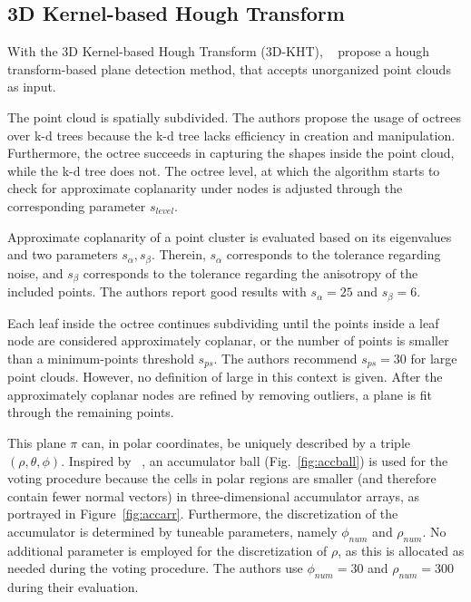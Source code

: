 \documentclass[main.tex]{subfiles}
\begin{document}
\subsection{3D Kernel-based Hough Transform}
\label{subsec:bg-3dkht}
With the 3D Kernel-based Hough Transform (3D-KHT),
\citeauthor{LimbergerOliveira2015HT3D}~\cite{LimbergerOliveira2015HT3D} propose a hough transform-based plane detection method,
that accepts unorganized point clouds as input.

The point cloud is spatially subdivided. The authors propose the usage of octrees over k-d trees because the k-d tree lacks efficiency in creation and manipulation.
Furthermore, the octree succeeds in capturing the shapes inside the point cloud, while the k-d tree does not.
The octree level, at which the algorithm starts to check for approximate coplanarity under nodes is adjusted through 
the corresponding parameter $s_{level}$.

Approximate coplanarity of a point cluster is evaluated based on its eigenvalues and two parameters $s_\alpha, s_\beta$.
Therein, $s_\alpha$ corresponds to the tolerance regarding noise, and $s_\beta$ corresponds to the tolerance regarding the 
anisotropy of the included points. The authors report good results with $s_\alpha=25$ and $s_\beta=6$.

Each leaf inside the octree continues subdividing until the points inside a leaf node are considered approximately coplanar, 
or the number of points is smaller than a minimum-points threshold $s_{ps}$.
The authors recommend $s_{ps}=30$ for large point clouds. However, no definition of large in 
this context is given.
After the approximately coplanar nodes are refined by removing outliers, a plane is fit through the remaining points.


This plane $\pi$ can, in polar coordinates, be uniquely described by a triple $(\rho, \theta, \phi)$.
Inspired by \citeauthor{Borrmann_Elseberg_Lingemann_Nüchter_2011}~\cite{Borrmann_Elseberg_Lingemann_Nüchter_2011}, an accumulator ball (Fig.~\ref{fig:accball}) is used for the voting procedure because the cells in polar regions are smaller (and therefore
contain fewer normal vectors) in three-dimensional accumulator arrays, as portrayed in Figure~\ref{fig:accarr}.
Furthermore, the discretization of the accumulator is determined by tuneable parameters, namely $\phi_{num}$ and $\rho_{num}$.
No additional parameter is employed for the discretization of $\rho$, as this is allocated as needed during the voting procedure.
The authors use $\phi_{num}=30$ and $\rho_{num}=300$ during their evaluation.
\end{document}
